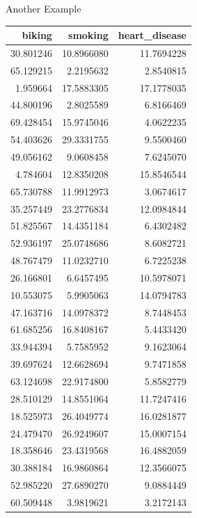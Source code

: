 \documentclass[
  ignorenonframetext,
]{beamer}
\begin{document}
\begin{frame}{Another Example}
\protect\hypertarget{another-example}{}
\begin{table}
\centering
\begin{tabular}[t]{r|r|r}
\hline
biking & smoking & heart\_disease\\
\hline
30.801246 & 10.8966080 & 11.7694228\\
\hline
65.129215 & 2.2195632 & 2.8540815\\
\hline
1.959664 & 17.5883305 & 17.1778035\\
\hline
44.800196 & 2.8025589 & 6.8166469\\
\hline
69.428454 & 15.9745046 & 4.0622235\\
\hline
54.403626 & 29.3331755 & 9.5500460\\
\hline
49.056162 & 9.0608458 & 7.6245070\\
\hline
4.784604 & 12.8350208 & 15.8546544\\
\hline
65.730788 & 11.9912973 & 3.0674617\\
\hline
35.257449 & 23.2776834 & 12.0984844\\
\hline
51.825567 & 14.4351184 & 6.4302482\\
\hline
52.936197 & 25.0748686 & 8.6082721\\
\hline
48.767479 & 11.0232710 & 6.7225238\\
\hline
26.166801 & 6.6457495 & 10.5978071\\
\hline
10.553075 & 5.9905063 & 14.0794783\\
\hline
47.163716 & 14.0978372 & 8.7448453\\
\hline
61.685256 & 16.8408167 & 5.4433420\\
\hline
33.944394 & 5.7585952 & 9.1623064\\
\hline
39.697624 & 12.6628694 & 9.7471858\\
\hline
63.124698 & 22.9174800 & 5.8582779\\
\hline
28.510129 & 14.8551064 & 11.7247416\\
\hline
18.525973 & 26.4049774 & 16.0281877\\
\hline
24.479470 & 26.9249607 & 15.0007154\\
\hline
18.358646 & 23.4319568 & 16.4882059\\
\hline
30.388184 & 16.9860864 & 12.3566075\\
\hline
52.985220 & 27.6890270 & 9.0884449\\
\hline
60.509448 & 3.9819621 & 3.2172143\\
\hline

\end{tabular}
\end{table}
\end{frame}
\end{document}

